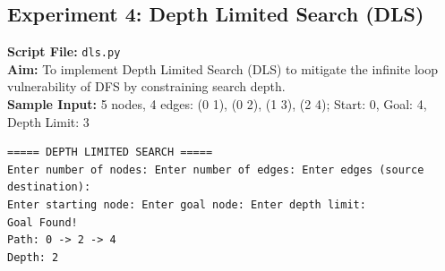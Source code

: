 \subsection*{Experiment 4: Depth Limited Search (DLS)}
\textbf{Script File:} \texttt{dls.py} \\[4pt]
\textbf{Aim:} To implement Depth Limited Search (DLS) to mitigate the infinite loop vulnerability of DFS by constraining search depth. \\[4pt]
\textbf{Sample Input:} 5 nodes, 4 edges: (0 1), (0 2), (1 3), (2 4); Start: 0, Goal: 4, Depth Limit: 3 \\[6pt]
\begin{tcolorbox}[colback=black!5!white,colframe=black!75!white,title=Terminal Execution Output - Depth Limited Search (DLS)]
\begin{verbatim}
===== DEPTH LIMITED SEARCH =====
Enter number of nodes: Enter number of edges: Enter edges (source destination):
Enter starting node: Enter goal node: Enter depth limit: 
Goal Found!
Path: 0 -> 2 -> 4
Depth: 2
\end{verbatim}
\end{tcolorbox}

